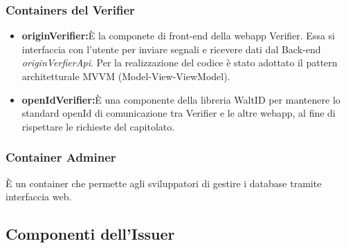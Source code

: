 \subsubsection{Containers del \textbf{Verifier}}
\begin{itemize}
    \item \textbf{originVerifier:}È la componete di front-end della webapp Verifier. Essa si interfaccia con l'utente per inviare segnali e ricevere dati dal Back-end \textit{originVerfierApi}. Per la realizzazione del codice è stato adottato il pattern architetturale MVVM (Model-View-ViewModel).
    \item \textbf{openIdVerifier:}È una componente della libreria WaltID per mantenere lo standard openId di comunicazione tra Verifier e le altre webapp, al fine di rispettare le richieste del capitolato.
\end{itemize}
\subsubsection{Container \textbf{Adminer}}
È un container che permette agli sviluppatori di gestire i database tramite interfaccia web.

\clearpage

\subsection{Componenti dell'\textbf{Issuer}}

